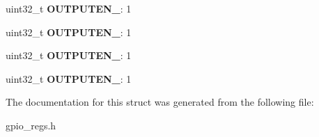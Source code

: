 \begin{DoxyCompactItemize}
\item 
\hypertarget{structGPIO__OE_a3a4d4613e6ace2fdfa69b51963540ce4}{uint32\-\_\-t {\bfseries O\-U\-T\-P\-U\-T\-E\-N\-\_}\-: 1}\label{structGPIO__OE_a3a4d4613e6ace2fdfa69b51963540ce4}

\item 
\hypertarget{structGPIO__OE_a238af8fab29b12b2f7a02c991d68f9c0}{uint32\-\_\-t {\bfseries O\-U\-T\-P\-U\-T\-E\-N\-\_}\-: 1}\label{structGPIO__OE_a238af8fab29b12b2f7a02c991d68f9c0}

\item 
\hypertarget{structGPIO__OE_a71fcc58aca59d44d6d54946c705aab2d}{uint32\-\_\-t {\bfseries O\-U\-T\-P\-U\-T\-E\-N\-\_}\-: 1}\label{structGPIO__OE_a71fcc58aca59d44d6d54946c705aab2d}

\item 
\hypertarget{structGPIO__OE_a97ddaf7c3ce47d6e0d8bd3e8fb1f7f77}{uint32\-\_\-t {\bfseries O\-U\-T\-P\-U\-T\-E\-N\-\_}\-: 1}\label{structGPIO__OE_a97ddaf7c3ce47d6e0d8bd3e8fb1f7f77}

\end{DoxyCompactItemize}


The documentation for this struct was generated from the following file\-:\begin{DoxyCompactItemize}
\item 
gpio\-\_\-regs.\-h\end{DoxyCompactItemize}
